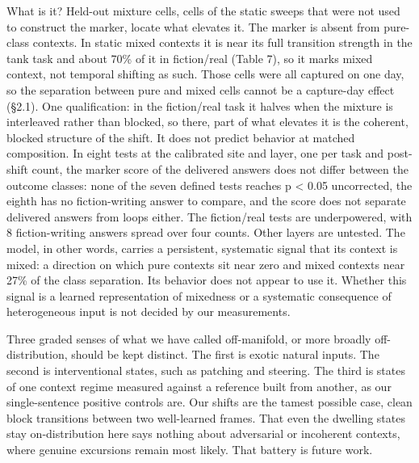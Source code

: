 \documentclass[11pt]{article}
\begin{document}
What is it? Held-out mixture cells, cells of the static sweeps that were not used to
construct the marker, locate what elevates it. The marker is absent from pure-class contexts. In static mixed contexts it is near
its full transition strength in the tank task and about 70\% of it in fiction/real
(Table 7), so it marks mixed context, not temporal shifting as such. Those cells were all
captured on one day, so the separation between pure and mixed cells cannot be a
capture-day effect (\S2.1). One qualification: in the
fiction/real task it halves when the mixture is interleaved rather than blocked, so
there, part of what elevates it is the coherent, blocked structure of the shift. It does not predict behavior at matched composition. In eight tests at the calibrated site and layer, one per task and post-shift count, the marker score of the delivered answers does not differ between the outcome classes: none of the seven defined tests reaches p < 0.05 uncorrected, the eighth has no fiction-writing answer to compare, and the score does not separate delivered answers from loops either. The fiction/real tests are underpowered, with 8 fiction-writing answers spread over four counts. Other layers are untested. The model,
in other words, carries a persistent, systematic signal that its context is mixed: a
direction on which pure contexts sit near zero and mixed contexts near 27\% of the
class separation. Its behavior does not appear to use it. Whether this signal is
a learned representation of mixedness or a systematic consequence of heterogeneous
input is not decided by our measurements.

Three graded senses of what we have called off-manifold, or more broadly
off-distribution, should be kept distinct. The first is
exotic natural inputs. The second is interventional states, such as patching and
steering. The third is states of one context regime measured against a reference
built from another, as our single-sentence positive controls are. Our shifts are the tamest possible case, clean
block transitions between two well-learned frames. That even the dwelling states stay
on-distribution here says nothing about adversarial or incoherent contexts, where
genuine excursions remain most likely. That battery is future work.
\end{document}
